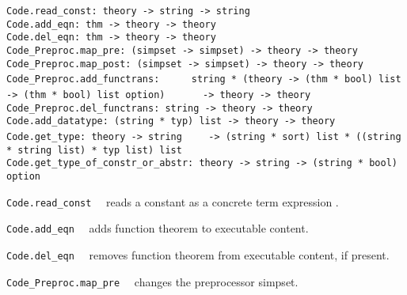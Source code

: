 \begin{isabellebody}
\isamarkuptrue%
%
\isadelimmlref
%
\endisadelimmlref
%
\isatagmlref
%
\begin{isamarkuptext}%
\begin{mldecls}
  \verb|Code.read_const: theory -> string -> string| \\
  \verb|Code.add_eqn: thm -> theory -> theory| \\
  \verb|Code.del_eqn: thm -> theory -> theory| \\
  \verb|Code_Preproc.map_pre: (simpset -> simpset) -> theory -> theory| \\
  \verb|Code_Preproc.map_post: (simpset -> simpset) -> theory -> theory| \\
  \verb|Code_Preproc.add_functrans: |\isasep\isanewline%
\verb|    string * (theory -> (thm * bool) list -> (thm * bool) list option)|\isasep\isanewline%
\verb|      -> theory -> theory| \\
  \verb|Code_Preproc.del_functrans: string -> theory -> theory| \\
  \verb|Code.add_datatype: (string * typ) list -> theory -> theory| \\
  \verb|Code.get_type: theory -> string|\isasep\isanewline%
\verb|    -> (string * sort) list * ((string * string list) * typ list) list| \\
  \verb|Code.get_type_of_constr_or_abstr: theory -> string -> (string * bool) option|
  \end{mldecls}

  \begin{description}

  \item \verb|Code.read_const|~~
     reads a constant as a concrete term expression .

  \item \verb|Code.add_eqn|~~ adds function
     theorem  to executable content.

  \item \verb|Code.del_eqn|~~ removes function
     theorem  from executable content, if present.

  \item \verb|Code_Preproc.map_pre|~~ changes
     the preprocessor simpset.


\end{description}
\end{isamarkuptext}
\end{isabellebody}
